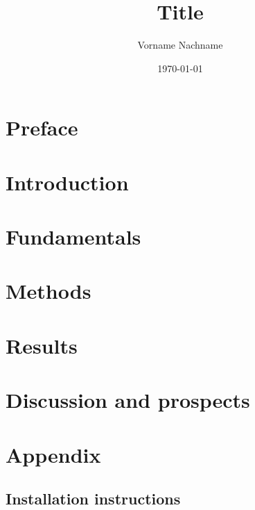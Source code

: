 \documentclass[a4paper, abstract=on]{scrreprt}
\title{Title}
\author{Vorname Nachname}
\date{\today}
\begin{document}


\clearpage
\setcounter{page}{1}



\begin{abstract}

\end{abstract}

\chapter*{Preface}

\thispagestyle{empty}

\tableofcontents
\thispagestyle{empty}


\chapter{Introduction}
\setcounter{page}{1}


\chapter{Fundamentals}


\chapter{Methods}


\chapter{Results}


\chapter{Discussion and prospects}


\newpage

\listoffigures

\printbibliography[title=Bibliography]

\appendix
\chapter{Appendix}
\section{Installation instructions}

\end{document}
